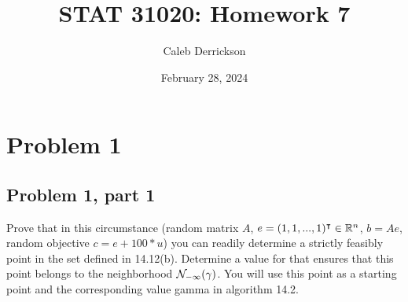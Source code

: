 

\title{STAT 31020: Homework 7}
\author{Caleb Derrickson}
\date{February 28, 2024}


\onehalfspacing
\maketitle
\allowdisplaybreaks

\tableofcontents

\newpage
\section{Problem 1}
\subsection{Problem 1, part 1}
Prove that in this circumstance (random matrix $A$, $e = (1, 1, ..., 1)^{\intercal} \in \mathbb{R}^n$, $b = Ae$, random objective $c = e + 100*u $) you can readily determine a strictly feasibly point in the set defined in 14.12(b). Determine a value for that ensures that this point belongs to the neighborhood $\mathcal{N}_{-\infty}(\gamma)$. You will use this point as a starting point and the corresponding value gamma in algorithm 14.2. 
\partbreak
